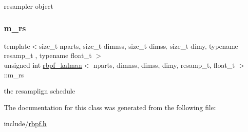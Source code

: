resampler object \mbox{\label{classrbpf__kalman_a625192fecb630044a08a445f0abb7cdf}} 
\subsubsection{\texorpdfstring{m\+\_\+rs}{m\_rs}}
{\footnotesize\ttfamily template$<$size\+\_\+t nparts, size\+\_\+t dimnss, size\+\_\+t dimss, size\+\_\+t dimy, typename resamp\+\_\+t , typename float\+\_\+t $>$ \\
unsigned int \hyperlink{classrbpf__kalman}{rbpf\+\_\+kalman}$<$ nparts, dimnss, dimss, dimy, resamp\+\_\+t, float\+\_\+t $>$\+::m\+\_\+rs\hspace{0.3cm}{\ttfamily [private]}}

the resamplign schedule 

The documentation for this class was generated from the following file\+:\begin{DoxyCompactItemize}
\item 
include/\hyperlink{rbpf_8h}{rbpf.\+h}\end{DoxyCompactItemize}
